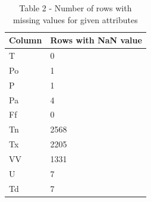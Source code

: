 \begin{table}[H]
\caption*{Table 2 - Number of rows with missing values for given attributes}
\centering
\begin{tabular}{|l|l|}
\hline
Column & Rows 				with NaN value \\ \hline
T      & 0                       \\ \hline
Po     & 1                       \\ \hline
P      & 1                       \\ \hline
Pa     & 4                       \\ \hline
Ff     & 0                       \\ \hline
Tn     & 2568                    \\ \hline
Tx     & 2205                    \\ \hline
VV     & 1331                    \\ \hline
U      & 7                       \\ \hline
Td     & 7                       \\ \hline
\end{tabular}
\end{table}

